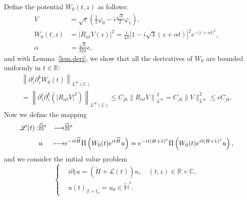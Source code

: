 \documentclass[AHL,Unicode,published]{cedram}
\newcommand{\C}{\mathbb{C}}
\newcommand{\R}{\mathbb{R}}
\newcommand{\HH}{\mathbb{H}}
\renewcommand{\L}{\mathscr{L}}
\newcommand*\eps{\epsilon}
\newcommand*\dis{\displaystyle}
\newcommand{\ov}{\overline}
\newcommand{\wt}{\widetilde}
\newcommand{\<}{\langle}
\renewcommand{\>}{\rangle}
\renewcommand{\phi}{\varphi}
\newcommand{\R}{\mathbb{R}}
\begin{document}
Define the potential $W_0(t,z)$ as follows:
\begin{align*}
V &=\sqrt{\eps}\left(\frac12\phi_0-i\frac{\sqrt{3}}2\phi_1\right), \\
W_0(t,z)&=\left|R_{\alpha t}V(z)\right|^2=\frac{\eps}{4\pi}\left| 1-i\sqrt{3}(z+\alpha t) \right|^2e^{-|z+\alpha t|^2}, \\
 \alpha &=\frac{\sqrt{3}}{32 \pi} \eps,
\end{align*}
and with Lemma~\ref{lem.deri}, we show that all the derivatives of $W_0$ are bounded uniformly in $t\in \R$:
\begin{multline}\label{bk2}
\left\|\partial^j_{\ov z } \partial^k_z W_0(t)\right\|_{L^{\infty}(\C)}\\
= \left\|\partial^j_{\ov z } \partial^k_z \left(\left|R_{\alpha t}V\right|^2\right) \right\|_{L^{\infty}(\C)} \leq C_{jk} \left\| R_{\alpha t}V\right\|^2_{L^\infty} = C_{jk} \| V\|^2_{L^\infty} \leq \eps C_{jk}.
\end{multline}
Now we define the mapping
\begin{equation}\label{def-L}
\begin{aligned}
\L(t) : &\widetilde{\HH}^{s}&\longrightarrow&\widetilde{\HH}^{s}\\[3pt]
\dis & u &\longmapsto & e^{-it \wt{H}} \Pi\left(W_0(t)e^{it \wt{H}} u\right)= e^{-it (H+1)^{\rho}} \Pi\left(W_0(t)e^{it (H+1)^{\rho}} u\right),
\end{aligned}
\end{equation}
and we consider the initial value problem
\begin{equation}\label{le-pb}
\begin{cases}
&i\partial_t u=\left(\wt{H}+\L(t) \right)u, \quad (t,z)\in \R\times \C,\\
&u(t)_{|t=t_0}= u_0 \in \widetilde{\HH}^{s}.
\end{cases}
\end{equation}
\end{document}
